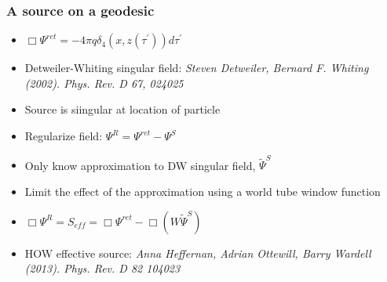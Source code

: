 \documentclass{beamer}
\begin{document}
\begin{frame}
  \frametitle{A source on a geodesic}
  \begin{itemize}
    \item$\Box\Psi^{ret}=-4\pi q\delta_4(x,z(\tau^\prime))d\tau^\prime$
    \item Detweiler-Whiting singular field: {\em Steven Detweiler, Bernard F. Whiting (2002). Phys. Rev. D 67, 024025}
    \item Source is siingular at location of particle
    \item Regularize field: $\Psi^R=\Psi^{ret}-\Psi^S$
    \item Only know approximation to DW singular field, $\tilde{\Psi}^S$
    \item Limit the effect of the approximation using a world tube window function
  \item $\Box\Psi^R=S_{eff}=\Box\Psi^{ret}-\Box(W\tilde{\Psi}^S)$
  \item HOW effective source: {\em Anna Heffernan, Adrian Ottewill, Barry Wardell (2013). Phys. Rev. D 82 104023}
  \end{itemize}
\end{frame}
\end{document}
